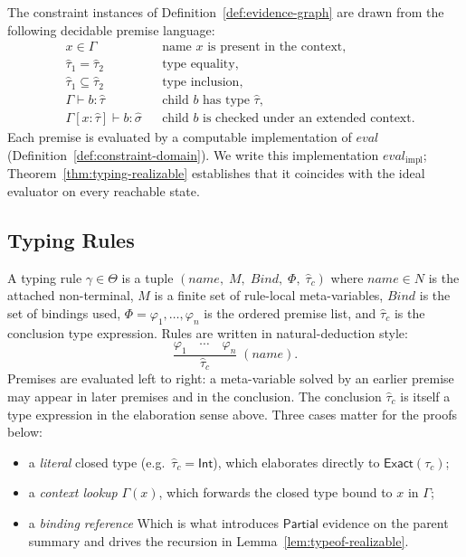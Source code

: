 The constraint instances of Definition~\ref{def:evidence-graph} are drawn from
the following decidable premise language:
\begin{align*}
	 & x \in \Gamma
	 &                                          & \text{name $x$ is present in the context,}             \\
	 & \hat\tau_1 = \hat\tau_2
	 &                                          & \text{type equality,}                                  \\
	 & \hat\tau_1 \subseteq \hat\tau_2
	 &                                          & \text{type inclusion,}                                 \\
	 & \Gamma \vdash b : \hat\tau
	 &                                          & \text{child $b$ has type $\hat\tau$,}                  \\
	 & \Gamma[x:\hat\tau] \vdash b : \hat\sigma
	 &                                          & \text{child $b$ is checked under an extended context.}
\end{align*}
Each premise is evaluated by a computable implementation of $\mathit{eval}$
(Definition~\ref{def:constraint-domain}). We write this implementation
$\mathit{eval}_{\mathrm{impl}}$; Theorem~\ref{thm:typing-realizable} establishes
that it coincides with the ideal evaluator on every reachable state.
\subsection*{Typing Rules}



A typing rule $\gamma \in \Theta$ is a tuple $(\mathit{name},\; M,\; \mathit{Bind},\; \Phi,\; \hat\tau_c)$ where $\mathit{name} \in N$ is the attached non-terminal, $M$ is a finite set of rule-local meta-variables, $\mathit{Bind}$ is the set of bindings used, $\Phi = \varphi_1, \ldots, \varphi_n$ is the ordered premise list, and $\hat\tau_c$ is the conclusion type expression. Rules are written in natural-deduction style:
\[
	\frac{\varphi_1 \quad \cdots \quad \varphi_n}{\hat\tau_c}
	\;(\mathit{name}).
\]
Premises are evaluated left to right: a meta-variable solved by an earlier premise may appear in later premises and in the conclusion. The conclusion $\hat\tau_c$ is itself a type expression in the elaboration sense above. Three cases matter for the proofs below:
\begin{itemize}
	\item a \emph{literal} closed type (e.g.\ $\hat\tau_c = \mathsf{Int}$), which elaborates directly to $\mathsf{Exact}(\tau_c)$;
	\item a \emph{context lookup} $\Gamma(x)$, which forwards the closed type bound to $x$ in $\Gamma$;
	\item a \emph{binding reference}  Which is what introduces $\mathsf{Partial}$ evidence on the parent summary and drives the recursion in Lemma~\ref{lem:typeof-realizable}.
\end{itemize}

